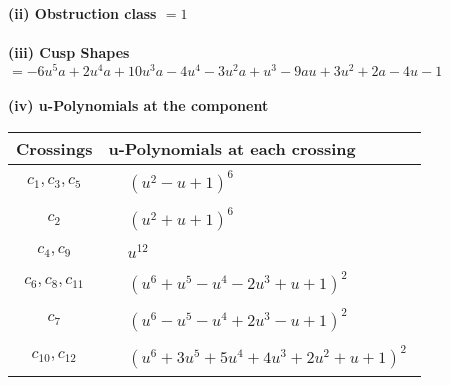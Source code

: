 \documentclass[1p]{elsarticle_modified}
\theoremstyle{definition}
\begin{document}
\flushleft \textbf{(ii) Obstruction class $= 1$}\\~\\
\flushleft \textbf{(iii) Cusp Shapes $= -6 u^5 a+2 u^4 a+10 u^3 a-4 u^4-3 u^2 a+u^3-9 a u+3 u^2+2 a-4 u-1$}\\~\\
\newpage\renewcommand{\arraystretch}{1}
\flushleft \textbf{(iv) u-Polynomials at the component}\newline \\
\begin{tabular}{m{50pt}|m{274pt}}
Crossings & \hspace{64pt}u-Polynomials at each crossing \\
\hline $$\begin{aligned}c_{1},c_{3},c_{5}\end{aligned}$$&$\begin{aligned}
&(u^2- u+1)^6
\end{aligned}$\\
\hline $$\begin{aligned}c_{2}\end{aligned}$$&$\begin{aligned}
&(u^2+u+1)^6
\end{aligned}$\\
\hline $$\begin{aligned}c_{4},c_{9}\end{aligned}$$&$\begin{aligned}
&u^{12}
\end{aligned}$\\
\hline $$\begin{aligned}c_{6},c_{8},c_{11}\end{aligned}$$&$\begin{aligned}
&(u^6+u^5- u^4-2 u^3+u+1)^2
\end{aligned}$\\
\hline $$\begin{aligned}c_{7}\end{aligned}$$&$\begin{aligned}
&(u^6- u^5- u^4+2 u^3- u+1)^2
\end{aligned}$\\
\hline $$\begin{aligned}c_{10},c_{12}\end{aligned}$$&$\begin{aligned}
&(u^6+3 u^5+5 u^4+4 u^3+2 u^2+u+1)^2
\end{aligned}$\\
\hline
\end{tabular}\\~\\
\end{document}
